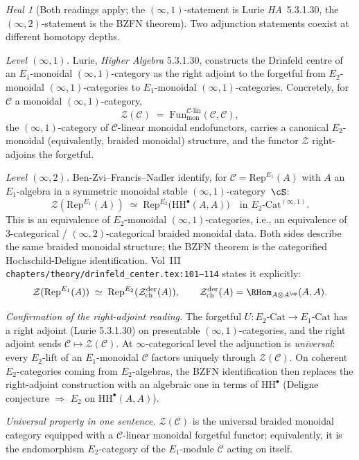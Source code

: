 \documentclass[11pt]{article}
\theoremstyle{definition}
\theoremstyle{remark}
\newtheorem{heal}[thm]{Heal}
\newcommand{\cC}{\mathcal{C}}
\newcommand{\cZ}{\mathcal{Z}}
\newcommand{\Rep}{\mathrm{Rep}}
\newcommand{\Eone}{E_1}
\newcommand{\Etwo}{E_2}
\newcommand{\HH}{\mathrm{HH}}
\newcommand{\Zder}{\cZ^{\mathrm{der}}_{\mathrm{ch}}}
\begin{document}
\begin{heal}[Both readings apply; the $(\infty,1)$-statement is Lurie
\emph{HA}~5.3.1.30, the $(\infty,2)$-statement is the
BZFN theorem]
\label{heal:drinfeld-adjoint}
Two adjunction statements coexist at different homotopy depths.

\emph{Level $(\infty, 1)$.} Lurie, \emph{Higher Algebra}
5.3.1.30, constructs the Drinfeld centre of an
$\Eone$-monoidal $(\infty,1)$-category as the right adjoint
to the forgetful from $\Etwo$-monoidal $(\infty,1)$-categories
to $\Eone$-monoidal $(\infty,1)$-categories. Concretely, for
$\cC$ a monoidal $(\infty, 1)$-category,
\[
\cZ(\cC) \;=\;
\mathrm{Fun}^{\cC\text{-lin}}_{\mathrm{mon}}(\cC, \cC),
\]
the $(\infty, 1)$-category of $\cC$-linear monoidal endofunctors,
carries a canonical $\Etwo$-monoidal (equivalently, braided
monoidal) structure, and the functor $\cZ$ right-adjoins the
forgetful.

\emph{Level $(\infty, 2)$.} Ben-Zvi--Francis--Nadler
\cite{BFN2010} identify, for $\cC = \Rep^{\Eone}(A)$ with $A$ an
$\Eone$-algebra in a symmetric monoidal stable
$(\infty, 1)$-category~$\cS$:
\[
\cZ(\Rep^{\Eone}(A))
\;\simeq\;
\Rep^{\Etwo}\bigl(\HH^\bullet(A, A)\bigr)
\quad\text{in $\Etwo\text{-Cat}^{(\infty,1)}$}.
\]
This is an equivalence of $\Etwo$-monoidal $(\infty,1)$-categories,
i.e., an equivalence of $3$-categorical / $(\infty,2)$-categorical
braided monoidal data. Both sides describe the same braided
monoidal structure; the BZFN theorem is the categorified
Hochschild-Deligne identification. Vol~III
\texttt{chapters/theory/drinfeld\_center.tex:101--114} states it
explicitly:
\[
\cZ(\Rep^{\Eone}(A)) \;\simeq\; \Rep^{\Etwo}(\Zder(A)),
\qquad
\Zder(A) = \RHom_{A\otimes A^{\op}}(A, A).
\]

\emph{Confirmation of the right-adjoint reading.} The
forgetful $U\colon \Etwo\text{-Cat} \to \Eone\text{-Cat}$ has a
right adjoint (Lurie 5.3.1.30) on presentable $(\infty, 1)$-categories,
and the right adjoint sends $\cC \mapsto \cZ(\cC)$. At
$\infty$-categorical level the adjunction is \emph{universal}:
every $\Etwo$-lift of an $\Eone$-monoidal $\cC$ factors uniquely
through $\cZ(\cC)$. On coherent $\Etwo$-categories coming from
$\Etwo$-algebras, the BZFN identification then replaces the
right-adjoint construction with an algebraic one in terms of
$\HH^\bullet$ (Deligne conjecture $\Rightarrow$ $\Etwo$ on
$\HH^\bullet(A, A)$).

\emph{Universal property in one sentence.} $\cZ(\cC)$ is the
universal braided monoidal category equipped with a
$\cC$-linear monoidal forgetful functor; equivalently, it is the
endomorphism $\Etwo$-category of the $\Eone$-module $\cC$
acting on itself.


\end{heal}
\end{document}
